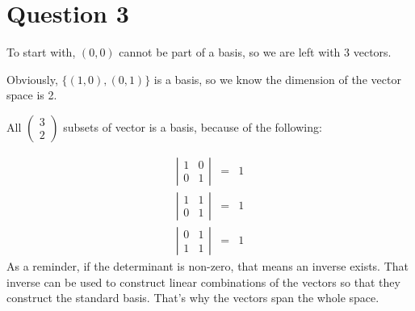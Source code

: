 \section*{Question 3}
To start with, $ (0, 0) $ cannot be part of a basis, so we are left with 3 vectors.

Obviously, $ \{(1, 0), (0, 1)\} $ is a basis, so we know the dimension of the vector space is 2.

All $ \left( \begin{array}{c} 3 \\ 2 \end{array} \right) $ subsets of vector is a basis, because of the following:

\begin{eqnarray*}
\left|
\begin{array}{cc}
  1 & 0 \\
  0 & 1
\end{array}
\right| &=& 1 \\
\left|
\begin{array}{cc}
  1 & 1 \\
  0 & 1
\end{array}
\right| &=& 1 \\
\left|
\begin{array}{cc}
  0 & 1 \\
  1 & 1
\end{array}
\right| &=& 1
\end{eqnarray*}
As a reminder, if the determinant is non-zero, that means an inverse exists. That inverse can be used to construct linear combinations of the vectors so that they construct the standard basis. That's why the vectors span the whole space.